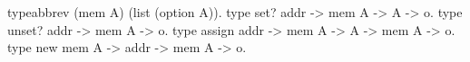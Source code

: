   typeabbrev (mem A) (list (option A)).
  type set? addr -> mem A -> A -> o.
  type unset? addr -> mem A -> o.
  type assign addr -> mem A -> A -> mem A -> o.
  type new mem A -> addr -> mem A -> o.
